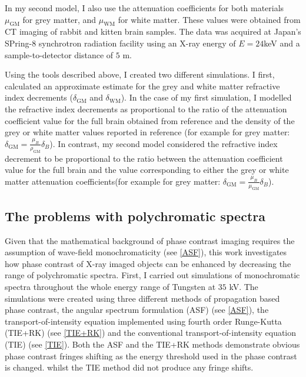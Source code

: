 \documentclass[10pt, a4paper, singlespacing]{report}
\begin{document}
In my second model, I also use the attenuation coefficients for both materials $\mu_{\mathrm{GM}}$ for grey matter, and $\mu_{\mathrm{WM}}$ for white matter. These values were obtained from CT imaging of rabbit and kitten brain samples. The data was acquired at Japan's SPring-8 synchrotron radiation facility using an X-ray energy of $E = 24$keV and a sample-to-detector distance of $5$ m\cite{Linda}.

Using the tools described above, I created two different simulations. I first, calculated an approximate estimate for the grey and white matter refractive index decrements ($\delta_{\mathrm{GM}}$ and $\delta_{\mathrm{WM}}$). In the case of my first simulation, I modelled the refractive index decrements as proportional to the ratio of the attenuation coefficient value for the full brain obtained from reference \cite{NIST} and the density of the grey or white matter values reported in reference \cite{ITIS} (for example for grey matter: $\delta_{\mathrm{GM}} = \frac{\mu_B}{\rho_{\mathrm{GM}}} \delta_B$). In contrast, my second model considered the refractive index decrement to be proportional to the ratio between the attenuation coefficient value for the full brain and the value corresponding to either the grey or white matter attenuation coefficients(for example for grey matter: $\delta_{\mathrm{GM}} = \frac{\mu_B}{\mu_{\mathrm{GM}}} \delta_B$). 


\subsection{The problems with polychromatic spectra}\label{poly}
Given that the mathematical background of phase contrast imaging requires the assumption of wave-field monochromaticity (see \ref{ASF}), this work investigates how phase contrast of X-ray imaged objects can be enhanced by decreasing the range of polychromatic spectra. 
First, I carried out simulations of monochromatic spectra throughout the whole energy range of Tungsten at $35$ kV. The simulations were created using three different methods of propagation based phase contrast, the angular spectrum formulation (ASF) (see \ref{ASF}), the transport-of-intensity equation implemented using fourth order Runge-Kutta (TIE+RK) (see \ref{TIE+RK}) and the conventional transport-of-intensity equation (TIE) (see \ref{TIE}). Both the ASF and the TIE+RK methods demonstrate obvious phase contrast fringes shifting as the energy threshold used in the phase contrast is changed. whilst the TIE method did not produce any fringe shifts. 
\end{document}
